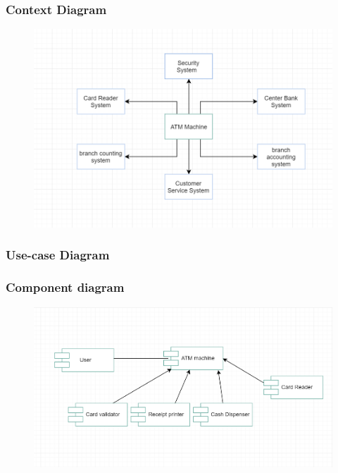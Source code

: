 \documentclass{article}
\begin{document}
	\subsubsection{Context Diagram}
		\begin{figure}[h!]
			\begin{center}
				\includegraphics[width=\linewidth]{img/context.png}
			\end{center}
		\end{figure}	
	\newpage\subsubsection{Use-case Diagram}
	\newpage\subsubsection{Component diagram}
		\begin{figure}[h!]
			\begin{center}
				\includegraphics[width=\linewidth]{img/component.png}
			\end{center}
		\end{figure}
\end{document}
